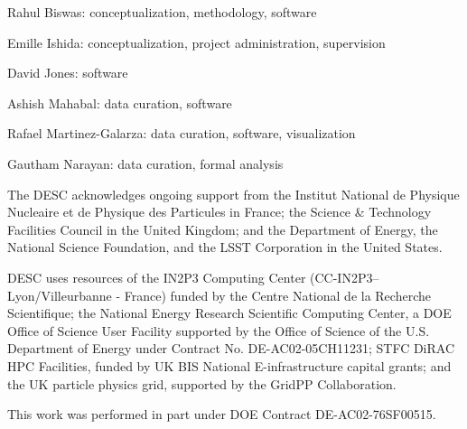 \documentclass[\docopts]{\docclass}
\begin{document}
Rahul Biswas: conceptualization, methodology, software

Emille Ishida: conceptualization, project administration, supervision

David Jones: software

Ashish Mahabal: data curation, software

Rafael Martinez-Galarza: data curation, software, visualization

Gautham Narayan: data curation, formal analysis





The DESC acknowledges ongoing support from the Institut National de Physique Nucleaire et de Physique des Particules in France; the Science & Technology Facilities Council in the United Kingdom; and the Department of Energy, the National Science Foundation, and the LSST Corporation in the United States.

DESC uses resources of the IN2P3 Computing Center (CC-IN2P3--Lyon/Villeurbanne - France) funded by the Centre National de la Recherche Scientifique; the National Energy Research Scientific Computing Center, a DOE Office of Science User Facility supported by the Office of Science of the U.S. Department of Energy under Contract No. DE-AC02-05CH11231; STFC DiRAC HPC Facilities, funded by UK BIS National E-infrastructure capital grants; and the UK particle physics grid, supported by the GridPP Collaboration.

This work was performed in part under DOE Contract DE-AC02-76SF00515.




\end{document}

